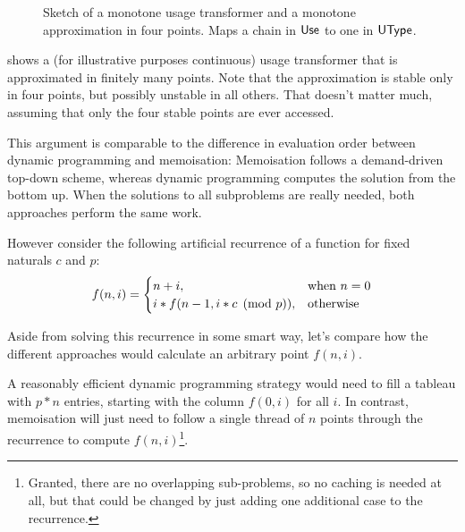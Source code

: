 \begin{figure}[h]
  \centering
  \caption{Sketch of a monotone usage transformer and a monotone approximation in four points. Maps a chain in $\text{\textsf{Use}}$ to one in $\text{\textsf{UType}}$.}
  \label{fig:approx}
\end{figure}

 shows a (for illustrative purposes continuous) usage transformer that is approximated in finitely many points. 
Note that the approximation is stable only in four points, but possibly unstable in all others.
That doesn't matter much, assuming that only the four stable points are ever accessed.\smallskip

This argument is comparable to the difference in evaluation order between dynamic programming and memoisation: 
Memoisation follows a demand-driven top-down scheme, whereas dynamic programming computes the solution from the bottom up.
When the solutions to all subproblems are really needed, both approaches perform the same work.

However consider the following artificial recurrence of a function for fixed naturals $c$ and $p$:
\[
  f(n, i) = \begin{cases}
    n+i, & \text{when } n = 0 \\
    i*f(n-1, i*c\tpmod{p}), & \text{otherwise}
  \end{cases}
\]

Aside from solving this recurrence in some smart way, let's compare how the different approaches would calculate an arbitrary point $f(n,i)$.

A reasonably efficient dynamic programming strategy would need to fill a tableau with $p*n$ entries, starting with the column $f(0,i)$ for all $i$.
In contrast, memoisation will just need to follow a single thread of $n$ points through the recurrence to compute $f(n,i)$\footnote{Granted, there are no overlapping sub-problems, so no caching is needed at all, but that could be changed by just adding one additional case to the recurrence.}.

